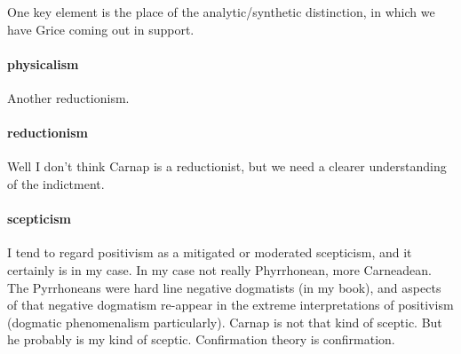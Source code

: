 \documentclass[10pt,titlepage]{book}
\newcommand{\ignore}[1]{}
\begin{document}
One key element is the place of the analytic/synthetic distinction, in which we have Grice coming out in support.
 
\paragraph{physicalism}

\ignore{
Well, if this is not the antonym of phenomenalism, he must be  
meaning something alla Smart, identity thesis. Neutralism, Monism, I'm 
surprised  don't challenge him. The opposite, Spritualism, is more of a scarer, 
too.
}

Another reductionism.
 
\paragraph{reductionism}

\ignore{
We see his problem with reductive AND reductionist analysis.  
So here it's eliminationism he objects. And he does it because, once a  
linguistic botaniser, allways (sic) a linguistic botaniser. What's the good of  
having learned English if Stich and Churchland and the rest of them are 
going to  tell you that, roughly, is all false (cf. Jones on Formal versus 
Natural  Languages, though).
}

Well I don't think Carnap is a reductionist, but we need a clearer understanding of the indictment.

\paragraph{scepticism}

\ignore{
This is loose Grice. He thinks Gettier etc are too rigid. We  
know more than we care to admit. A schoolboy knows that the battle of 
Trafalgar  was in 1811, etc. So no need to be Phyrronian. I see Jones's pdf. has a 
section  on my favourite philosopher of Antiquity: Phyrro, and so I'm ready 
to  distinguish between good and bad sceptics. They were all good, honest 
people in  fact. I think it's the French philosophers, Voltaire, etc. who gave 
scepticism a  bad name.
}

I tend to regard positivism as a mitigated or moderated scepticism, and it certainly is in my case.
In my case not really Phyrrhonean, more Carneadean.
The Pyrrhoneans were hard line negative dogmatists (in my book), and aspects of that negative dogmatism re-appear in the extreme interpretations of positivism (dogmatic phenomenalism particularly).
Carnap is not that kind of sceptic.
But he probably is my kind of sceptic.
Confirmation theory is confirmation.
\end{document}
